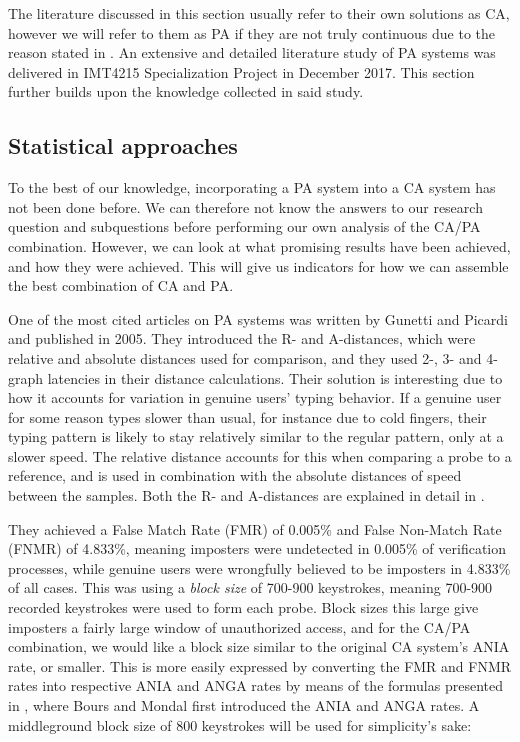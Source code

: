 The literature discussed in this section usually refer to their own solutions as CA, however we will refer to them as PA if they are not truly continuous due to the reason stated in .
An extensive and detailed literature study of PA systems \cite{nilsenSpec} was delivered in IMT4215 Specialization Project in December 2017.
This section further builds upon the knowledge collected in said study.

\subsection{Statistical approaches}
\label{sec:related-statistical-approaches}
To the best of our knowledge, incorporating a PA system into a CA system has not been done before. 
We can therefore not know the answers to our research question and subquestions before performing our own analysis of the CA/PA combination.
However, we can look at what promising results have been achieved, and how they were achieved.
This will give us indicators for how we can assemble the best combination of CA and PA.

One of the most cited articles on PA systems was written by Gunetti and Picardi \cite{gnp} and published in 2005.
They introduced the R- and A-distances, which were relative and absolute distances used for comparison, and they used 2-, 3- and 4-graph latencies in their distance calculations.
Their solution is interesting due to how it accounts for variation in genuine users' typing behavior.
If a genuine user for some reason types slower than usual, for instance due to cold fingers, their typing pattern is likely to stay relatively similar to the regular pattern, only at a slower speed.
The relative distance accounts for this when comparing a probe to a reference, and is used in combination with the absolute distances of speed between the samples.
Both the R- and A-distances are explained in detail in .

They achieved a False Match Rate (FMR) of 0.005\% and False Non-Match Rate (FNMR) of 4.833\%, meaning imposters were undetected in 0.005\% of verification processes, while genuine users were wrongfully believed to be imposters in 4.833\% of all cases. 
This was using a \textit{block size} of 700-900 keystrokes, meaning 700-900 recorded keystrokes were used to form each probe.
Block sizes this large give imposters a fairly large window of unauthorized access, and for the CA/PA combination, we would like a block size similar to the original CA system's ANIA rate, or smaller.
This is more easily expressed by converting the FMR and FNMR rates into respective ANIA and ANGA rates by means of the formulas presented in \cite{CA-performance}, where Bours and Mondal first introduced the ANIA and ANGA rates.
A middleground block size of 800 keystrokes will be used for simplicity's sake:

